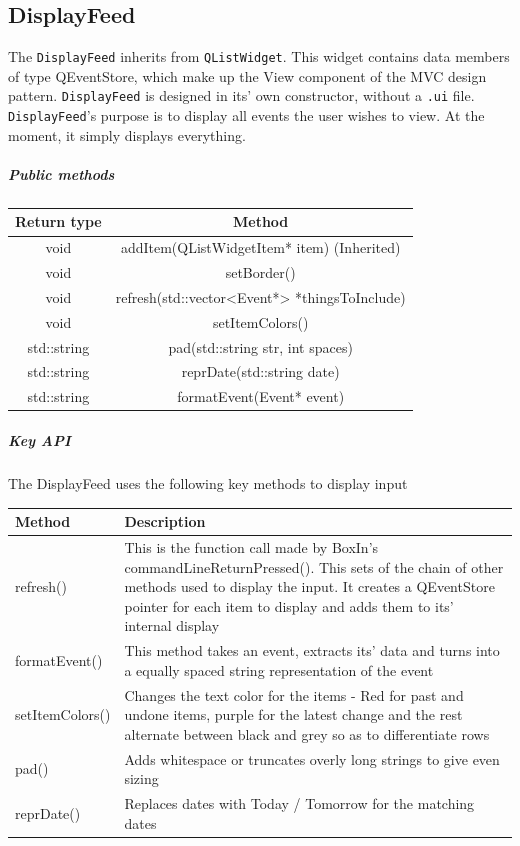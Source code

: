 \documentclass[12pt]{extarticle}
\begin{document}
\subsection{DisplayFeed}
The \texttt{DisplayFeed} inherits from \texttt{QListWidget}. This widget contains data members of type QEventStore, which make up the View component of the MVC design pattern. \texttt{DisplayFeed} is designed in its' own constructor, without a \texttt{.ui} file. \texttt{DisplayFeed}'s purpose is to display all events the user wishes to view. At the moment, it simply displays everything.
\subparagraph{Public methods}
\begin{tabular}{c c}
Return type & Method\\
\hline
void & addItem(QListWidgetItem* item) (Inherited)\\
void & setBorder()\\
void & refresh(std::vector<Event*> *thingsToInclude)\\
void & setItemColors()\\
std::string & pad(std::string str, int spaces)\\
std::string & reprDate(std::string date)\\
std::string & formatEvent(Event* event)\\
\end{tabular}

\subparagraph{Key API}The DisplayFeed uses the following key methods to display input\\
\begin{tabular}{p{6cm} p{12cm}}
Method & Description\\
\hline
refresh() & This is the function call made by BoxIn's commandLineReturnPressed(). This sets of the chain of other methods used to display the input. It creates a QEventStore pointer for each item to display and adds them to its' internal display\\
formatEvent() & This method takes an event, extracts its' data and turns into a equally spaced string representation of the event\\
setItemColors() & Changes the text color for the items - Red for past and undone items, purple for the latest change and the rest alternate between black and grey so as to differentiate rows\\
pad() & Adds whitespace or truncates overly long strings to give even sizing\\
reprDate() & Replaces dates with Today / Tomorrow for the matching dates
\end{tabular}
\pagebreak
\end{document}
